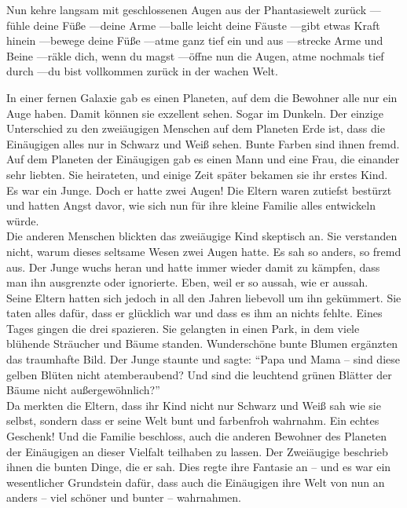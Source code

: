 Nun kehre langsam mit geschlossenen Augen aus der Phantasiewelt zurück —fühle deine Füße —deine Arme —balle leicht deine Fäuste —gibt etwas Kraft hinein —bewege deine Füße —atme ganz tief ein und aus —strecke Arme und Beine —räkle dich, wenn du magst —öffne nun die Augen, atme nochmals tief durch —du bist vollkommen zurück in der wachen Welt.

In einer fernen Galaxie gab es einen Planeten, auf dem die Bewohner alle nur ein Auge haben. Damit können sie exzellent sehen. Sogar im Dunkeln. Der einzige Unterschied zu den zweiäugigen Menschen auf dem Planeten Erde ist, dass die Einäugigen alles nur in Schwarz und Weiß sehen. Bunte Farben sind ihnen fremd.\\

Auf dem Planeten der Einäugigen gab es einen Mann und eine Frau, die einander sehr liebten. Sie heirateten, und einige Zeit später bekamen sie ihr erstes Kind. Es war ein Junge. Doch er hatte zwei Augen! Die Eltern waren zutiefst bestürzt und hatten Angst davor, wie sich nun für ihre kleine Familie alles entwickeln würde. \\

Die anderen Menschen blickten das zweiäugige Kind skeptisch an. Sie verstanden nicht, warum dieses seltsame Wesen zwei Augen hatte. Es sah so anders, so fremd aus. Der Junge wuchs heran und hatte immer wieder damit zu kämpfen, dass man ihn ausgrenzte oder ignorierte. Eben, weil er so aussah, wie er aussah. \\

Seine Eltern hatten sich jedoch in all den Jahren liebevoll um ihn gekümmert. Sie taten alles dafür, dass er glücklich war und dass es ihm an nichts fehlte. Eines Tages gingen die drei spazieren. Sie gelangten in einen Park, in dem viele blühende Sträucher und Bäume standen. Wunderschöne bunte Blumen ergänzten das traumhafte Bild. Der Junge staunte und sagte: “Papa und Mama – sind diese gelben Blüten nicht atemberaubend? Und sind die leuchtend grünen Blätter der Bäume nicht außergewöhnlich?”\\

Da merkten die Eltern, dass ihr Kind nicht nur Schwarz und Weiß sah wie sie selbst, sondern dass er seine Welt bunt und farbenfroh wahrnahm. Ein echtes Geschenk! Und die Familie beschloss, auch die anderen Bewohner des Planeten der Einäugigen an dieser Vielfalt teilhaben zu lassen. Der Zweiäugige beschrieb ihnen die bunten Dinge, die er sah. Dies regte ihre Fantasie an – und es war ein wesentlicher Grundstein dafür, dass auch die Einäugigen ihre Welt von nun an anders – viel schöner und bunter – wahrnahmen. \\

